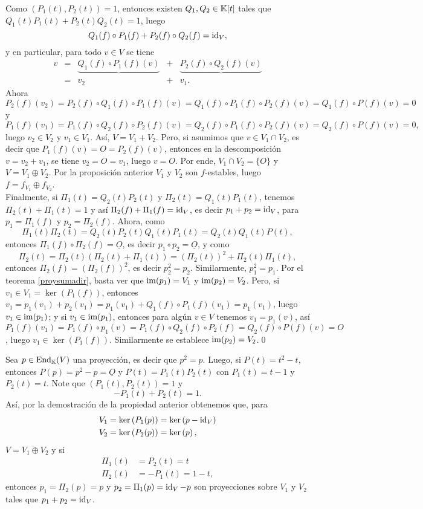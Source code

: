 \dem Como $\left(P_1(t),P_2(t)\right)=1$, entonces existen $Q_1,Q_2\in \mathbb{K}[t]$ tales que $Q_1(t)P_1(t)+P_2(t)Q_2(t)=1$, luego
\[
Q_1(f)\circ P_1(f)+P_2(f)\circ Q_2(f)=\operatorname{id}_V,
\]
y en particular, para todo $v\in V$ se tiene
\[
\begin{array}{rcccc}
v & = & \underbrace{Q_1(f)\circ P_1(f)(v)} & + & \underbrace{P_2(f)\circ Q_2(f)(v)}\\
  & = & v_2 & + & v_1.
\end{array}
\]
Ahora
\[
P_2(f)(v_2)=P_2(f)\circ Q_1(f)\circ P_1(f)(v)=Q_1(f)\circ P_1(f)\circ P_2(f) (v)=Q_1(f)\circ P(f)(v)=0
\]
y
\[
P_1(f)(v_1)=P_1(f)\circ Q_2(f)\circ P_2(f)(v)=Q_2(f)\circ P_1(f)\circ P_2(f) (v)=Q_2(f)\circ P(f)(v)=0,
\]
luego $v_2\in V_2$ y $v_1\in V_1$. As\'i, $V=V_1+V_2$. Pero, si asumimos que $v\in V_1\cap V_2$, es decir que $P_1(f)(v)=O=P_2(f)(v)$, entonces en la descomposición $v=v_2+v_1$, se tiene $v_2=O=v_1$, luego $v=O$. Por ende, $V_1\cap V_2=\{O\}$ y $V=V_1\oplus V_2$. Por la proposición anterior $V_1$ y $V_2$ son $f$-estables, luego $f=f_{V_1}\oplus f_{V_2}$.\\
Finalmente, si $\Pi_1(t)=Q_2(t)P_2(t)$ y $\Pi_2(t)=Q_1(t)P_1(t)$, tenemos $\Pi_2(t)+\Pi_1(t)=1$ y así
$\Pi_2(f)+\Pi_1(f)=\operatorname{id}_V$, es decir $p_1+p_2=\operatorname{id}_V$, para $p_1=\Pi_1(f)$ y $p_2=\Pi_2(f)$. Ahora, como
\[
\Pi_1(t)\Pi_2(t)=Q_2(t)P_2(t)Q_1(t)P_1(t)=Q_2(t)Q_1(t)P(t),
\]
entonces $\Pi_1(f)\circ\Pi_2(f)=\underline{O}$, es decir $p_1\circ p_2=\underline{O}$, y como
\[
\Pi_2(t)=\Pi_2(t)\left(\Pi_2(t)+\Pi_1(t)\right)=\left(\Pi_2(t)\right)^2+\Pi_2(t)\Pi_1(t),
\]
entonces $\Pi_2(f)=\left(\Pi_2(f)\right)^2$, es decir $p_2^2=p_2$. Similarmente, $p_1^2=p_1$. Por el teorema \ref{proysumadir}, basta ver que $\operatorname{im}(p_1)=V_1$ y $\operatorname{im}(p_2)=V_2$. Pero, si $v_1\in V_1=\ker(P_1(f))$, entonces $v_1=p_1(v_1)+p_2(v_1)=p_1(v_1)+Q_1(f)\circ P_1(f)(v_1)=p_1(v_1)$, luego $v_1\in\operatorname{im}(p_1)$; y si $v_1\in\operatorname{im}(p_1)$, entonces para algún $v\in V$ tenemos $v_1=p_1(v)$, así $P_1(f)(v_1)=P_1(f)\circ p_1(v)=P_1(f)\circ Q_2(f)\circ P_2(f)=Q_2(f)\circ P(f)(v)=O$, luego $v_1\in\ker(P_1(f))$. Similarmente se establece $\operatorname{im}(p_2)=V_2$.\qed

\begin{ejem}
Sea $p\in\operatorname{End}_{\mathbb{K}}(V)$ una proyecci\'on, es decir que $p^2=p$. Luego, si $P(t)=t^2-t$, entonces $P(p)=p^2-p=\underline{O}$ y $P(t)=P_1(t)P_2(t)$ con $P_1(t)=t-1$ y $P_2(t)=t$. Note que $\left(P_1(t),P_2(t)\right)=1$ y $$-P_1(t)+P_2(t)=1.$$
As\'i, por la demostraci\'on de la propiedad anterior obtenemos que, para
\begin{align*}
V_1 & =\ker\left(P_1(p)\right)=\ker\left(p-\operatorname{id}_V\right)\\
V_2 & =\ker\left(P_2(p)\right)=\ker\left(p\right),
\end{align*}
$V=V_1\oplus V_2$ y si
\begin{align*}
\Pi_1(t) & =P_2(t)=t\\
\Pi_2(t) & =-P_1(t)=1-t,
\end{align*}
entonces $p_1=\Pi_2(p)=p$ y $p_2=\Pi_1(p)=\operatorname{id}_V-p$ son proyecciones sobre $V_1$ y $V_2$ tales que $p_1+p_2=\operatorname{id}_V$.
\end{ejem}

